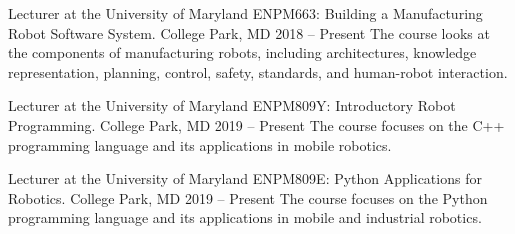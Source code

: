


\begin{cventries}


\cventry
{Lecturer at the University of Maryland} %
{ENPM663: Building a Manufacturing Robot Software System.} %
{College Park, MD} %
{2018 -- Present} %
{ %
The course looks at the components of manufacturing robots, including architectures, knowledge representation, planning, control, safety, standards, and human-robot interaction. 
}

\cventry
{Lecturer at the University of Maryland} %
{ENPM809Y: Introductory Robot Programming.} %
{College Park, MD} %
{2019 -- Present} %
{ %
The course focuses on the C++ programming language and its applications in mobile robotics.
}

\cventry
{Lecturer at the University of Maryland} %
{ENPM809E: Python Applications for Robotics.} %
{College Park, MD} %
{2019 -- Present} %
{ %
The course focuses on the Python programming language and its applications in mobile and industrial robotics.
}




\end{cventries}